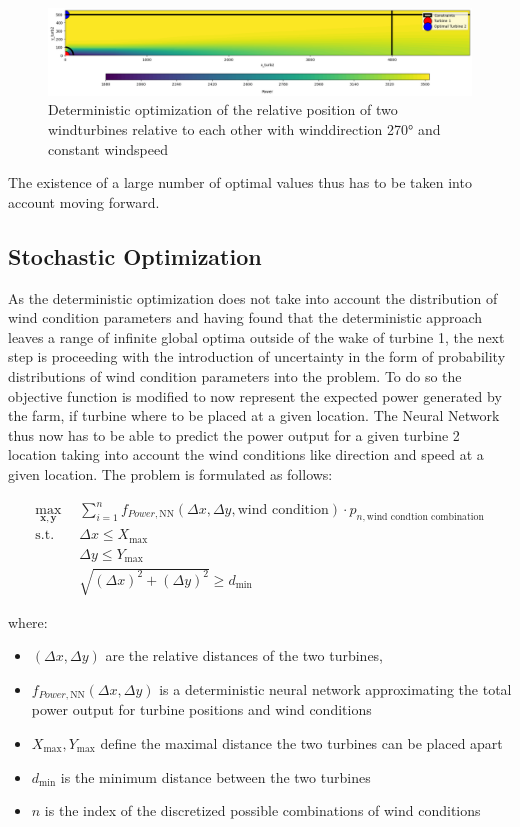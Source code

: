 \begin{figure}[h] 
	\centering
	\includegraphics[width=1\textwidth]{figures/optimization/opti_determ270.png} 
	\caption{Deterministic optimization of the relative position of two windturbines relative to each other with winddirection 270° and constant windspeed}
	\label{fig:opti_determ270}
\end{figure}

The existence of a large number of optimal values thus has to be taken into account moving forward.


\subsection{Stochastic Optimization}

As the deterministic optimization does not take into account the distribution of wind condition parameters and having found that the deterministic approach leaves a range of infinite global optima outside of the wake of turbine 1, the next step is proceeding with the introduction of uncertainty in the form of probability distributions of wind condition parameters into the problem. To do so the objective function is modified to now represent the expected power generated by the farm, if turbine where to be placed at a given location. The Neural Network thus now has to be able to predict the power output for a given turbine 2 location taking into account the wind conditions like direction and speed at a given location. The problem is formulated as follows: 

\begin{align}
	\max_{\mathbf{x}, \mathbf{y}} &  \sum_{i=1}^{n} f_{Power,\text{NN}}(\Delta x, \Delta y, \text{wind condition})\cdot p_{n,\text{wind condtion combination}} \\
	\text{s.t.} \quad 
	&  \Delta x \leq X_{\max} \\
	&  \Delta y \leq Y_{\max} \\
	& \sqrt{(\Delta x)^2 + (\Delta y)^2} \geq d_{\min}
\end{align}

where:
\begin{itemize}
	\item \( (\Delta x, \Delta y) \) are the relative distances of the two turbines,
	\item \( f_{Power, \text{NN}}(\Delta x, \Delta y)\) is a deterministic neural network  approximating the total power output for turbine positions and wind conditions
	\item \(  X_{\max}, Y_{\max} \) define the maximal distance the two turbines can be placed apart
	\item \( d_{\min} \) is the minimum distance between the two turbines
	\item \( n \) is the index of the discretized possible combinations of wind conditions 
\end{itemize}

